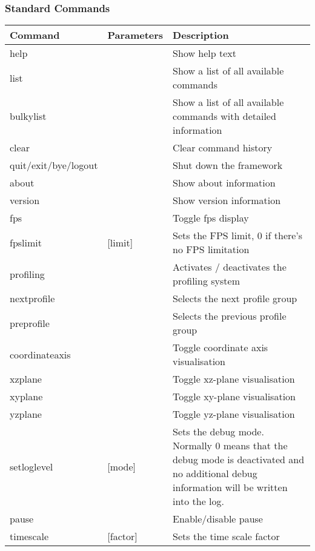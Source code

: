 \subsubsection{Standard Commands}
\begin{tabular}{|p{4cm}|p{2.4cm}|p{7.2cm}|}
\hline
\textbf{Command} & \textbf{Parameters} & \textbf{Description}\\
\hline
help                 &          & Show help text\\
\hline
list                 &          & Show a list of all available commands\\
\hline
bulkylist            &          & Show a list of all available commands with detailed information\\
\hline
clear                &          & Clear command history\\
\hline
quit/exit/bye/logout &          & Shut down the framework\\
\hline
about                &          & Show about information\\
\hline
version              &          & Show version information\\
\hline
fps                  &          & Toggle fps display\\
\hline
fpslimit             & [limit]  & Sets the FPS limit, 0 if there's no FPS limitation\\
\hline
profiling            &          & Activates / deactivates the profiling system\\
\hline
nextprofile          &          & Selects the next profile group\\
\hline
preprofile           &          & Selects the previous profile group\\
\hline
coordinateaxis       &          & Toggle coordinate axis visualisation\\
\hline
xzplane              &          & Toggle xz-plane visualisation\\
\hline
xyplane              &          & Toggle xy-plane visualisation\\
\hline
yzplane              &          & Toggle yz-plane visualisation\\
\hline
setloglevel          & [mode]   & Sets the debug mode. Normally 0 means that the debug mode is deactivated and no additional debug information will be written into the log.\\
\hline
pause                &          & Enable/disable pause\\
\hline
timescale            & [factor] & Sets the time scale factor\\
\hline
\end{tabular}



